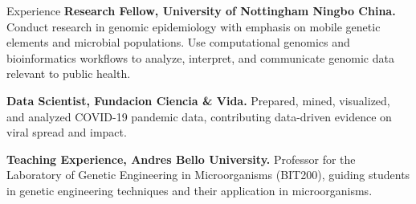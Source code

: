 \begin{rubric}{Experience}
%
	\textbf{Research Fellow, University of Nottingham Ningbo China.}
	Conduct research in genomic epidemiology with emphasis on mobile genetic elements and microbial populations. Use computational genomics and bioinformatics workflows to analyze, interpret, and communicate genomic data relevant to public health.

%
	\textbf{Data Scientist, Fundacion Ciencia \& Vida.}
	Prepared, mined, visualized, and analyzed COVID-19 pandemic data, contributing data-driven evidence on viral spread and impact.

%
	\textbf{Teaching Experience, Andres Bello University.}
	Professor for the Laboratory of Genetic Engineering in Microorganisms (BIT200), guiding students in genetic engineering techniques and their application in microorganisms.
\end{rubric}
